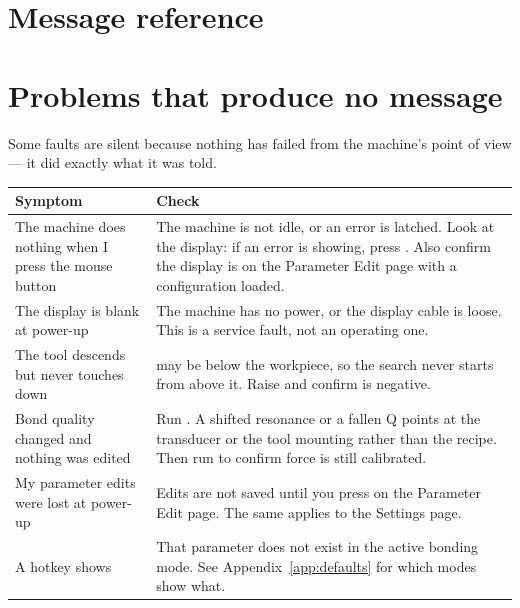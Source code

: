 \section{Message reference}



\section{Problems that produce no message}

Some faults are silent because nothing has failed from the machine's point of
view --- it did exactly what it was told.

\begin{center}\small
\begin{tabular}{@{}L{45mm}L{78mm}@{}}
\toprule
\textbf{Symptom} & \textbf{Check} \\
\midrule

The machine does nothing when I press the mouse button &
The machine is not idle, or an error is latched. Look at the display: if an
error is showing, press . Also confirm the display is on the
Parameter Edit page with a configuration loaded. \\
\addlinespace

The display is blank at power-up &
The machine has no power, or the display cable is loose. This is a service
fault, not an operating one. \\
\addlinespace

The tool descends but never touches down &
 may be below the workpiece, so the search never starts from
above it. Raise  and confirm  is
negative. \\
\addlinespace

Bond quality changed and nothing was edited &
Run . A shifted resonance or a fallen Q points at the transducer
or the tool mounting rather than the recipe. Then run  to confirm
force is still calibrated. \\
\addlinespace

My parameter edits were lost at power-up &
Edits are not saved until you press  on the Parameter Edit page.
The same applies to the Settings page. \\
\addlinespace

A hotkey shows  &
That parameter does not exist in the active bonding mode. See
Appendix~\ref{app:defaults} for which modes show what. \\

\bottomrule
\end{tabular}
\end{center}
